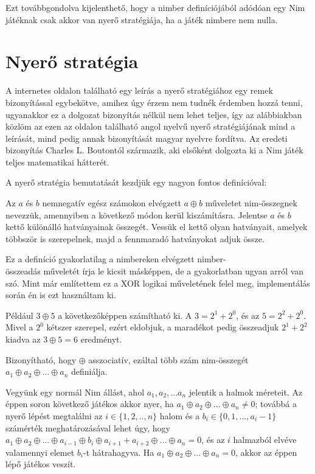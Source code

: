 Ezt továbbgondolva kijelenthető, hogy a nimber definíciójából adódóan egy Nim játéknak csak akkor van nyerő stratégiája, ha a játék nimbere nem nulla.

\section{Nyerő stratégia}
A \cite{bibref:brilliant_nim} internetes oldalon található egy leírás a nyerő stratégiához egy remek bizonyítással egybekötve, amihez úgy érzem nem tudnék érdemben hozzá tenni, ugyanakkor ez a dolgozat bizonyítás nélkül nem lehet teljes, így az alábbiakban közlöm az ezen az oldalon található angol nyelvű nyerő stratégiájának mind a leírását, mind pedig annak bizonyítását magyar nyelvre fordítva. Az eredeti bizonyítás Charles L. Boutontól származik, aki elsőként dolgozta ki a Nim játék teljes matematikai hátterét. \cite{bibref:bouton_nim} \ujsor

A nyerő stratégia bemutatását kezdjük egy nagyon fontos definícióval:
\begin{definition}
	Az $a$ és $b$ nemnegatív egész számokon elvégzett $a \oplus b$ műveletet nim-összegnek nevezzük, amennyiben a következő módon kerül kiszámításra. Jelentse $a$ és $b$ kettő különálló hatványainak összegét. Vessük el kettő olyan hatványait, amelyek többször is szerepelnek, majd a fennmaradó hatványokat adjuk össze.
\end{definition}

\begin{remark}
	Ez a definíció gyakorlatilag a nimbereken elvégzett nimber-\\összeadás műveletét írja le kicsit másképpen, de a gyakorlatban ugyan arról van szó. Mint már említettem ez a XOR logikai műveletének felel meg, implementálás során én is ezt használtam ki.
\end{remark}

Például $3 \oplus 5$ a következőképpen számítható ki. A $3 = 2^1 + 2^0$, és az $5 = 2^2 + 2^0$. Mivel a $2^0$ kétszer szerepel, ezért eldobjuk, a maradékot pedig  összeadjuk $2^1 + 2^2$ kiadva az $3 \oplus 5 = 6$ eredményt. \ujsor

Bizonyítható, hogy $\oplus$ asszociatív, ezáltal több szám nim-összegét $a_1 \oplus a_2 \oplus ... \oplus a_n$ definiálja. \ujsor

Vegyünk egy normál Nim állást, ahol $a_1, a_2, ... a_n$ jelentik a halmok méreteit. Az éppen soron következő játékos akkor nyer, ha $a_1 \oplus a_2 \oplus ... \oplus a_n \neq 0$; továbbá a nyerő lépést megtalálni az $i \in \{1, 2, .., n\}$ halom és a $b_i \in \{0, 1, ..., a_i -1\}$ számérték meghatározásával lehet úgy, hogy $a_1 \oplus a_2 \oplus ... \oplus a_{i-1} \oplus b_i \oplus a_{i+1} + a_{i+2} \oplus ... \oplus a_n = 0$, és az $i$ halmazból elvéve valamennyi elemet $b_i$-t hátrahagyva. Ha $a_1 \oplus a_2 \oplus ... \oplus a_n = 0$, akkor az éppen lépő játékos veszít. \ujsor

